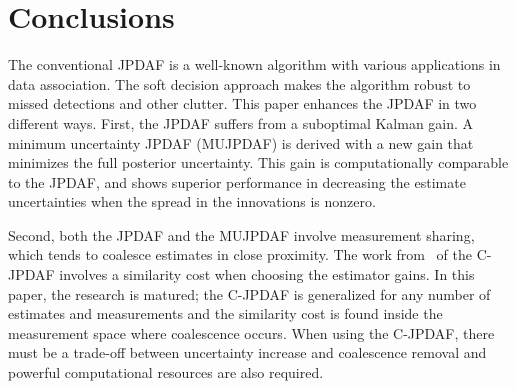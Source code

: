 \documentclass[letterpaper, 10pt, conference]{ieeeconf}
\begin{document}
\section{Conclusions}
\label{Conclusion}

The conventional JPDAF is a well-known algorithm with various applications in data association.
The soft decision approach makes the algorithm robust to missed detections and other clutter.
This paper enhances the JPDAF in two different ways.
First, the JPDAF suffers from a suboptimal Kalman gain.
A minimum uncertainty JPDAF (MUJPDAF) is derived with a new gain that minimizes the full posterior uncertainty.
This gain is computationally comparable to the JPDAF, and shows superior performance in decreasing the estimate uncertainties when the spread in the innovations is nonzero.

Second, both the JPDAF and the MUJPDAF involve measurement sharing, which tends to coalesce estimates in close proximity.
The work from~\cite{KauLovLee14} of the C-JPDAF involves a similarity cost when choosing the estimator gains.
In this paper, the research is matured; the C-JPDAF is generalized for any number of estimates and measurements and the similarity cost is found inside the measurement space where coalescence occurs.
When using the C-JPDAF, there must be a trade-off between uncertainty increase and coalescence removal and powerful computational resources are also required.



%
\end{document}
